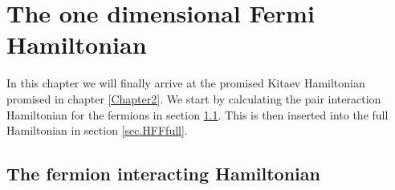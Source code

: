 
\chapter{The one dimensional Fermi Hamiltonian} %

\label{Chapter4} %


In this chapter we will finally arrive at the promised Kitaev Hamiltonian promised in chapter \ref{Chapter2}. We start by calculating the pair interaction Hamiltonian for the fermions in section \ref{sec.HFFint}. This is then inserted into the full Hamiltonian in section \ref{sec.HFFfull}.

\section{The fermion interacting Hamiltonian} \label{sec.HFFint}

